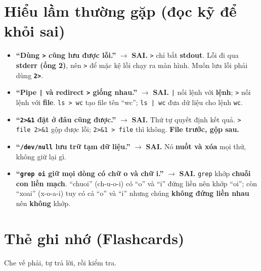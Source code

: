 \documentclass[12pt,a4paper]{article}
\newcommand{\cmd}[1]{\texttt{#1}}
\begin{document}
\section{Hiểu lầm thường gặp (đọc kỹ để khỏi sai)}

\begin{itemize}[leftmargin=1.4em]
\item \textbf{``Dùng \cmd{>} cũng lưu được lỗi.''} $\rightarrow$ \textbf{SAI.} \cmd{>} chỉ bắt \textbf{stdout}. Lỗi đi qua \textbf{stderr (ống 2)}, nên \cmd{>} để mặc kệ lỗi chạy ra màn hình. Muốn lưu lỗi phải dùng \textbf{\cmd{2>}}.
\item \textbf{``Pipe \cmd{|} và redirect \cmd{>} giống nhau.''} $\rightarrow$ \textbf{SAI.} \cmd{|} nối lệnh với \textbf{lệnh}; \cmd{>} nối lệnh với \textbf{file}. \cmd{ls > wc} tạo file tên ``wc''; \cmd{ls | wc} đưa dữ liệu cho lệnh \cmd{wc}.
\item \textbf{``\cmd{2>\&1} đặt ở đâu cũng được.''} $\rightarrow$ \textbf{SAI.} Thứ tự quyết định kết quả. \cmd{> file 2>\&1} gộp được lỗi; \cmd{2>\&1 > file} thì không. \textbf{File trước, gộp sau.}
\item \textbf{``\cmd{/dev/null} lưu trữ tạm dữ liệu.''} $\rightarrow$ \textbf{SAI.} Nó \textbf{nuốt và xóa} mọi thứ, không giữ lại gì.
\item \textbf{``\cmd{grep oi} giữ mọi dòng có chữ o và chữ i.''} $\rightarrow$ \textbf{SAI.} \cmd{grep} khớp \textbf{chuỗi con liền mạch}. ``chuoi'' (ch-u-o-i) có ``o'' và ``i'' đứng liền nên khớp ``oi''; còn ``xoai'' (x-o-a-i) tuy có cả ``o'' và ``i'' nhưng chúng \textbf{không đứng liền nhau} nên \textbf{không} khớp.
\end{itemize}

\section{Thẻ ghi nhớ (Flashcards)}

Che vế phải, tự trả lời, rồi kiểm tra.
\end{document}
